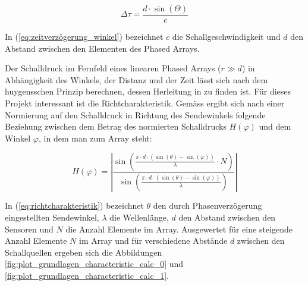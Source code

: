 \begin{equation}
\Delta \tau = \frac{d \cdot \sin(\Theta )}{c}
\label{eq:zeitverzögerung_winkel}
\end{equation}

In (\ref{eq:zeitverzögerung_winkel}) bezeichnet $c$ die Schallgeschwindigkeit und $d$ den Abstand zwischen den Elementen des Phased Arrays.

Der Schalldruck im Fernfeld eines linearen Phased Arrays ($r \gg d$) in Abhängigkeit des Winkels, der Distanz und der Zeit lässt sich nach dem huygensschen Prinzip berechnen, dessen Herleitung in \cite{SKUDRZYK} zu finden ist. Für dieses Projekt interessant ist die Richtcharakteristik. Gemäss \cite{WOOH} ergibt sich nach einer Normierung auf den Schalldruck in Richtung des Sendewinkels folgende Beziehung zwischen dem Betrag des normierten Schalldrucks $H(\varphi)$ und dem Winkel $\varphi$, in dem man zum Array steht:

\begin{equation}
 H(\varphi ) = \left | \frac{\sin(  \frac{\pi \cdot d \cdot (\sin(\theta)-\sin(\varphi))}{\lambda}\cdot N)}{\sin(\frac{\pi \cdot d \cdot (\sin(\theta)-\sin(\varphi))}{\lambda})} \right |
\label{eq:richtcharakteristik}
\end{equation}

In (\ref{eq:richtcharakteristik}) bezeichnet $\theta$ den durch Phasenverzögerung eingestellten Sendewinkel, $\lambda$ die Wellenlänge, $d$ den Abstand zwischen den Sensoren und $N$ die Anzahl Elemente im Array. Ausgewertet für eine steigende Anzahl Elemente $N$ im Array und für verschiedene Abstände $d$ zwischen den Schallquellen ergeben sich die Abbildungen \ref{fig:plot_grundlagen_characteristic_calc_0} und \ref{fig:plot_grundlagen_characteristic_calc_1}.

